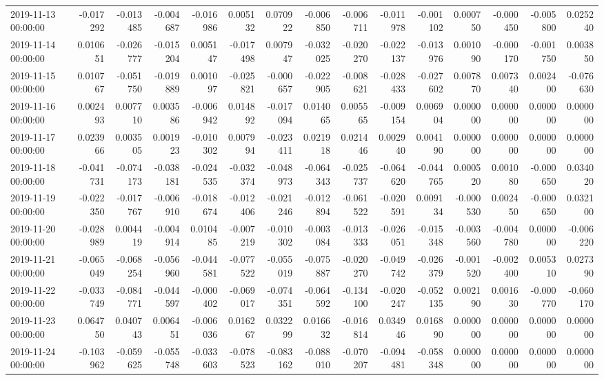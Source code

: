 \begin{tabular}{lrrrrrrrrrrrrrr}
2019-11-13 00:00:00 & -0.017292 & -0.013485 & -0.004687 & -0.016986 & 0.005132 & 0.070922 & -0.006850 & -0.006711 & -0.011978 & -0.001102 & 0.000750 & -0.000450 & -0.005800 & 0.025240 \\
2019-11-14 00:00:00 & 0.010651 & -0.026777 & -0.015204 & 0.005147 & -0.017498 & 0.007947 & -0.032025 & -0.020270 & -0.022137 & -0.013976 & 0.001090 & -0.000170 & -0.001750 & 0.003850 \\
2019-11-15 00:00:00 & 0.010767 & -0.051750 & -0.019889 & 0.001097 & -0.025821 & -0.000657 & -0.022905 & -0.008621 & -0.028433 & -0.027602 & 0.007870 & 0.007340 & 0.002400 & -0.076630 \\
2019-11-16 00:00:00 & 0.002493 & 0.007710 & 0.003586 & -0.006942 & 0.014892 & -0.017094 & 0.014065 & 0.005565 & -0.009154 & 0.006904 & 0.000000 & 0.000000 & 0.000000 & 0.000000 \\
2019-11-17 00:00:00 & 0.023966 & 0.003505 & 0.001923 & -0.010302 & 0.007994 & -0.023411 & 0.021918 & 0.021446 & 0.002940 & 0.004190 & 0.000000 & 0.000000 & 0.000000 & 0.000000 \\
2019-11-18 00:00:00 & -0.041731 & -0.074173 & -0.038181 & -0.024535 & -0.032374 & -0.048973 & -0.064343 & -0.025737 & -0.064620 & -0.044765 & 0.000520 & 0.001080 & -0.000650 & 0.034020 \\
2019-11-19 00:00:00 & -0.022350 & -0.017767 & -0.006910 & -0.018674 & -0.012406 & -0.021246 & -0.012894 & -0.061522 & -0.020591 & 0.009134 & -0.000530 & 0.002450 & -0.000650 & 0.032100 \\
2019-11-20 00:00:00 & -0.028989 & 0.004419 & -0.004914 & 0.010485 & -0.007219 & -0.010302 & -0.003084 & -0.013333 & -0.026051 & -0.015348 & -0.003560 & -0.004780 & 0.000000 & -0.006220 \\
2019-11-21 00:00:00 & -0.065049 & -0.068254 & -0.056960 & -0.044581 & -0.077522 & -0.055019 & -0.075887 & -0.020270 & -0.049742 & -0.026379 & -0.001520 & -0.002400 & 0.005310 & 0.027390 \\
2019-11-22 00:00:00 & -0.033749 & -0.084771 & -0.044597 & -0.000402 & -0.069017 & -0.074351 & -0.064592 & -0.134100 & -0.020247 & -0.052135 & 0.002190 & 0.001630 & -0.000770 & -0.060170 \\
2019-11-23 00:00:00 & 0.064750 & 0.040743 & 0.006451 & -0.006036 & 0.016267 & 0.032299 & 0.016632 & -0.016814 & 0.034946 & 0.016890 & 0.000000 & 0.000000 & 0.000000 & 0.000000 \\
2019-11-24 00:00:00 & -0.103962 & -0.059625 & -0.055748 & -0.033603 & -0.078523 & -0.083162 & -0.088010 & -0.070207 & -0.094481 & -0.058348 & 0.000000 & 0.000000 & 0.000000 & 0.000000 \\

\end{tabular}
